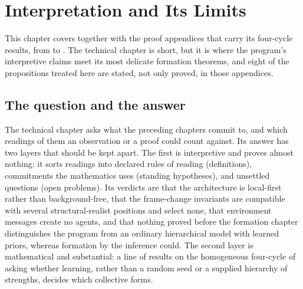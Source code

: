 \chapter{Interpretation and Its Limits}
\label{comp:ch14}

This chapter covers  together with the proof appendices that carry its four-cycle
results, from  to . The technical
chapter is short, but it is where the program's interpretive claims meet its most delicate formation
theorems, and eight of the propositions treated here are stated, not only proved, in those appendices.

\section{The question and the answer}
\label{comp:ch14-question}

The technical chapter asks what the preceding chapters commit to, and which readings of them an
observation or a proof could count against. Its answer has two layers that should be kept apart. The
first is interpretive and proves almost nothing: it sorts readings into declared rules of reading
(definitions), commitments the mathematics uses (standing hypotheses), and unsettled questions (open
problems). Its verdicts are that the architecture is local-first rather than background-free, that the
frame-change invariants are compatible with several structural-realist positions and select none, that
environment messages create no agents, and that nothing proved before the formation chapter
distinguishes the program from an ordinary hierarchical model with learned priors, whereas formation by
the inference could. The second layer is mathematical and substantial: a line of results on the
homogeneous four-cycle of  asking whether learning, rather than a
random seed or a supplied hierarchy of strengths, decides which collective forms.

